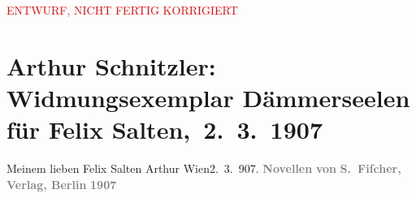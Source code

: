 
\begin{center}
            \textcolor{red}{ENTWURF, NICHT FERTIG KORRIGIERT}
                      \end{center}
            
         
         \renewcommand{\erwaehntePersonen}{Personen: Felix Salten}
         \renewcommand{\erwaehnteInstitutionen}{Institutionen: S. Fischer Verlag}
         \renewcommand{\erwaehnteOrte}{Orte: Berlin, Wien}
         \renewcommand{\erwaehnteWerke}{Werke: Dämmerseelen. Novellen}
               \section[ Arthur Schnitzler: Widmungsexemplar Dämmerseelen für Felix Salten, 2. 3. 1907]{ Arthur Schnitzler: Widmungsexemplar Dämmerseelen für Felix
               Salten, 2. 3. 1907}\nopagebreak{}\rehead{ }\begin{ledgroupsized}[t]{13cm}\normalsize\beginnumbering \toendnotes[C]{\smallbreak\pagebreak[2]} 
\pstart
           \noindent{}{\pb}Meinem lieben Felix Salten\pend
           \pstart \spacefill\mbox{Arthur}\pend{}\pstart
           Wien2. 3. 907.\pend
           {\bigskip}\pstart
           \noindent{}\centering{}{\pb}\textcolor{gray}{\textbf{}}\pend
           \pstart
           \noindent{}\centering{}\textcolor{gray}{\textbf{Novellen}}\pend
           \pstart
           \noindent{}\centering{}\textcolor{gray}{\textbf{von}}\pend
           \pstart
           \noindent{}\centering{}\textcolor{gray}{\textbf{}}\pend
           {\bigskip}\pstart
           \noindent{}\centering{}\textcolor{gray}{\textbf{S. Fiſcher, Verlag, Berlin}}\pend
           \pstart
           \noindent{}\centering{}\textcolor{gray}{\textbf{1907}}\pend
           
         
         \endnumbering{}\end{ledgroupsized}  \newcommand{\dateiname}{L03612}\newcommand{\titel}{Arthur Schnitzler: Widmungsexemplar Dämmerseelen für Felix Salten, 2. 3. 1907}\newcommand{\editorInnen}{Martin Anton Müller und Laura Untner}
      